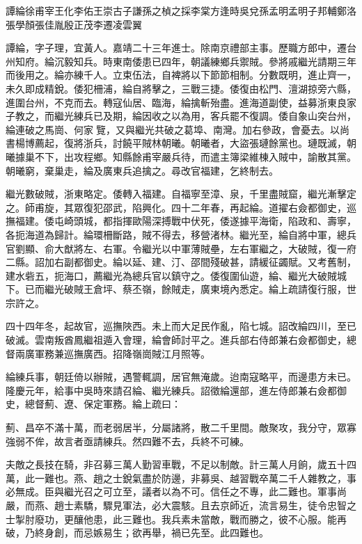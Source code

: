
\begin{pinyinscope}
譚綸徐甫宰王化李佑王崇古子謙孫之楨之採李棠方逢時吳兌孫孟明孟明子邦輔鄭洛張學顏張佳胤殷正茂李遷凌雲翼

譚綸，字子理，宜黃人。嘉靖二十三年進士。除南京禮部主事。歷職方郎中，遷台州知府。綸沉毅知兵。時東南倭患已四年，朝議練鄉兵禦賊。參將戚繼光請期三年而後用之。綸亦練千人。立束伍法，自裨將以下節節相制。分數既明，進止齊一，未久即成精銳。倭犯柵浦，綸自將擊之，三戰三捷。倭復由松門、澶湖掠旁六縣，進圍台州，不克而去。轉寇仙居、臨海，綸擒斬殆盡。進海道副使，益募浙東良家子教之，而繼光練兵已及期，綸因收之以為用，客兵罷不復調。倭自象山突台州，綸連破之馬崗、何家覽，又與繼光共破之葛埠、南灣。加右參政，會憂去。以尚書楊博薦起，復將浙兵，討饒平賊林朝曦。朝曦者，大盜張璉餘黨也。璉既滅，朝曦據巢不下，出攻程鄉。知縣餘甫宰嚴兵待，而遣主簿梁維棟入賊中，諭散其黨。朝曦窮，棄巢走，綸及廣東兵追擒之。尋改官福建，乞終制去。

繼光數破賊，浙東略定。倭轉入福建。自福寧至漳、泉，千里盡賊窟，繼光漸擊定之。師甫旋，其眾復犯邵武，陷興化。四十二年春，再起綸。道擢右僉都御史，巡撫福建。倭屯崎頭城，都指揮歐陽深搏戰中伏死，倭遂據平海衛，陷政和、壽寧，各扼海道為歸計。綸環柵斷路，賊不得去，移營渚林。繼光至，綸自將中軍，總兵官劉顯、俞大猷將左、右軍。令繼光以中軍薄賊壘，左右軍繼之，大破賊，復一府二縣。詔加右副都御史。綸以延、建、汀、邵間殘破甚，請緩征蠲賦。又考舊制，建水砦五，扼海口，薦繼光為總兵官以鎮守之。倭復圍仙遊，綸、繼光大破賊城下。已而繼光破賊王倉坪、蔡丕嶺，餘賊走，廣東境內悉定。綸上疏請復行服，世宗許之。

四十四年冬，起故官，巡撫陜西。未上而大足民作亂，陷七城。詔改綸四川，至已破滅。雲南叛酋鳳繼祖遁入會理，綸會師討平之。進兵部右侍郎兼右僉都御史，總督兩廣軍務兼巡撫廣西。招降嶺崗賊江月照等。

綸練兵事，朝廷倚以辦賊，遇警輒調，居官無淹歲。迨南寇略平，而邊患方未已。隆慶元年，給事中吳時來請召綸、繼光練兵。詔徵綸還部，進左侍郎兼右僉都御史，總督薊、遼、保定軍務。綸上疏曰：

薊、昌卒不滿十萬，而老弱居半，分屬諸將，散二千里間。敵聚攻，我分守，眾寡強弱不侔，故言者亟請練兵。然四難不去，兵終不可練。

夫敵之長技在騎，非召募三萬人勤習車戰，不足以制敵。計三萬人月餉，歲五十四萬，此一難也。燕、趙之士銳氣盡於防邊，非募吳、越習戰卒萬二千人雜教之，事必無成。臣與繼光召之可立至，議者以為不可。信任之不專，此二難也。軍事尚嚴，而燕、趙士素驕，驟見軍法，必大震駭。且去京師近，流言易生，徒令忠智之士掣肘廢功，更釀他患，此三難也。我兵素未當敵，戰而勝之，彼不心服。能再破，乃終身創，而忌嫉易生；欲再舉，禍已先至。此四難也。


\end{pinyinscope}
